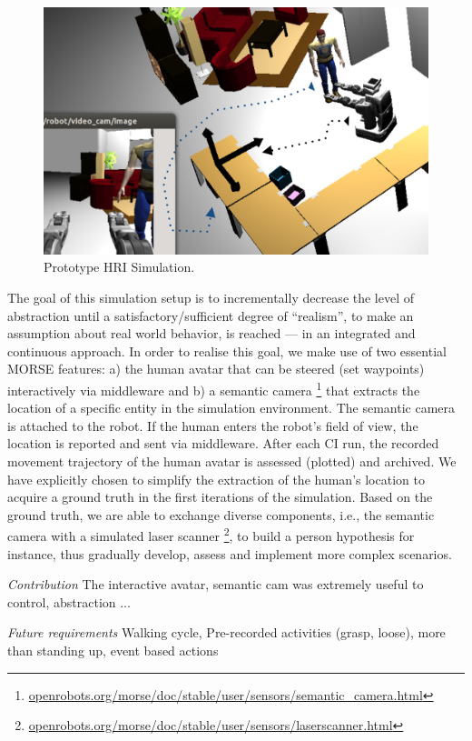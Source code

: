 \documentclass[conference]{IEEEtran}
\begin{document}
\begin{figure}[H]
      \centering
      \includegraphics[width=0.9\linewidth]{proto-setup.png}
      \caption{Prototype HRI Simulation.}
      \label{fig|proto}
\end{figure}

The goal of this simulation setup is to incrementally decrease the level of abstraction until a satisfactory/sufficient degree of ``realism'', to make an assumption about real world behavior, is reached --- in an integrated and continuous approach. In order to realise this goal, we make use of two essential MORSE features: a) the human avatar that can be steered (set waypoints) interactively via middleware and b) a semantic camera \footnote{\url{openrobots.org/morse/doc/stable/user/sensors/semantic_camera.html}} that extracts the location of a specific entity in the simulation environment. The semantic camera is attached to the robot. If the human enters the robot's field of view, the location is reported and sent via middleware. After each CI run, the recorded movement trajectory of the human avatar is assessed (plotted) and archived. We have explicitly chosen to simplify the extraction of the human's location to acquire a ground truth in the first iterations of the simulation. Based on the ground truth, we are able to exchange diverse components, i.e., the semantic camera with a simulated laser scanner \footnote{\url{openrobots.org/morse/doc/stable/user/sensors/laserscanner.html}}, to build a person hypothesis for instance, thus gradually develop, assess and implement more complex scenarios. 

\emph{Contribution} The interactive avatar, semantic cam was extremely useful to control, abstraction ...

\emph{Future requirements} Walking cycle, Pre-recorded activities (grasp, loose), more than standing up, event based actions
\end{document}
